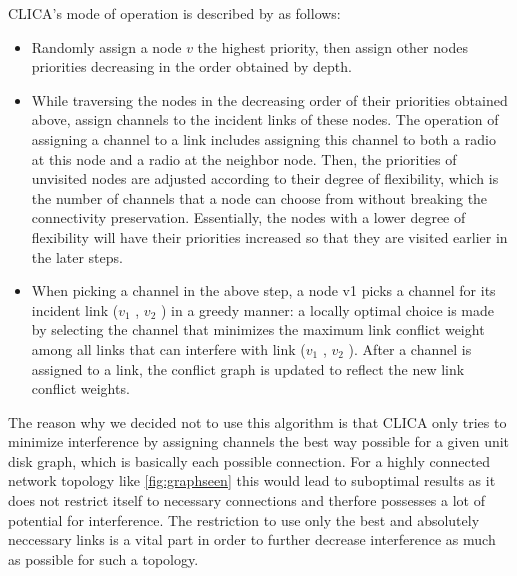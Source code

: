     CLICA's mode of operation is described by \cite{overview_caa} as follows:
    \begin{itemize}
      \item Randomly assign a node \(v\) the highest priority, then assign other
	nodes priorities decreasing in the order obtained by depth.
	
      \item While traversing the nodes in the decreasing order of their
	priorities obtained above, assign channels to the incident links
	of these nodes. The operation of assigning a channel to a link
	includes assigning this channel to both a radio at this node and
	a radio at the neighbor node. Then, the priorities of unvisited
	nodes are adjusted according to their degree of flexibility, which
	is the number of channels that a node can choose from without
	breaking the connectivity preservation. Essentially, the nodes
	with a lower degree of flexibility will have their priorities
	increased so that they are visited earlier in the later steps.
	
      \item When picking a channel in the above step, a node v1 picks
	a channel for its incident link (\(v_1\) , \(v_2\) ) in a greedy manner: a
	locally optimal choice is made by selecting the channel that
	minimizes the maximum link conflict weight among all links
	that can interfere with link (\(v_1\) , \(v_2\) ). After a channel is assigned
	to a link, the conflict graph is updated to reflect the new link conflict weights.
    \end{itemize}
  
    The reason why we decided not to use this algorithm is that \ac{CLICA} only tries to minimize interference by assigning channels the best way possible for a given
    unit disk graph, which is basically each possible connection. For a highly connected network topology like \ref{fig:graphseen} this would lead to suboptimal results
    as it does not restrict itself to necessary connections and therfore possesses a lot of potential for interference.
    The restriction to use only the best and absolutely neccessary links is a vital part in order to 
    further decrease interference as much as possible for such a topology.
    
